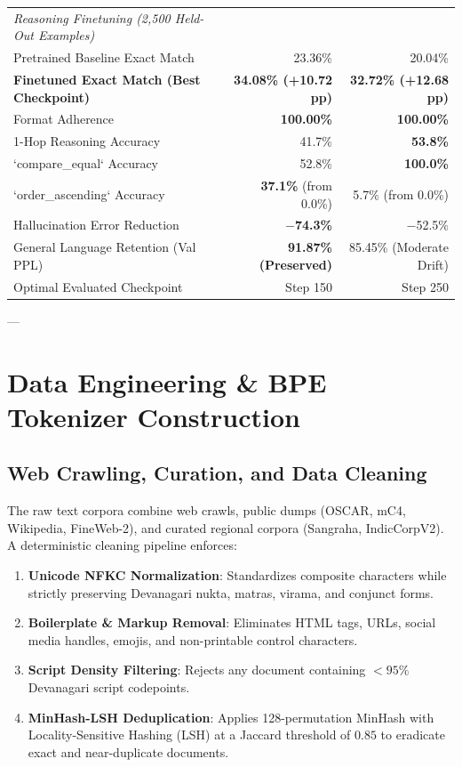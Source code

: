 \documentclass[11pt,a4paper]{article}
\begin{document}
\begin{table}[H]
\begin{tabular}{@{}lrr@{}}
\midrule
\textit{Reasoning Finetuning (2,500 Held-Out Examples)} & & \\
Pretrained Baseline Exact Match & 23.36\% & 20.04\% \\
\textbf{Finetuned Exact Match (Best Checkpoint)} & \textbf{34.08\% (+10.72 pp)} & \textbf{32.72\% (+12.68 pp)} \\
Format Adherence & \textbf{100.00\%} & \textbf{100.00\%} \\
1-Hop Reasoning Accuracy & 41.7\% & \textbf{53.8\%} \\
`compare\_equal` Accuracy & 52.8\% & \textbf{100.0\%} \\
`order\_ascending` Accuracy & \textbf{37.1\%} (from 0.0\%) & 5.7\% (from 0.0\%) \\
Hallucination Error Reduction & \textbf{$-$74.3\%} & $-$52.5\% \\
General Language Retention (Val PPL) & \textbf{91.87\% (Preserved)} & 85.45\% (Moderate Drift) \\
Optimal Evaluated Checkpoint & Step 150 & Step 250 \\
\bottomrule
\end{tabular}
\end{table}

---

\section{Data Engineering \& BPE Tokenizer Construction}

\subsection{Web Crawling, Curation, and Data Cleaning}
The raw text corpora combine web crawls, public dumps (OSCAR, mC4, Wikipedia, FineWeb-2), and curated regional corpora (Sangraha, IndicCorpV2). A deterministic cleaning pipeline enforces:
\begin{enumerate}[noitemsep]
    \item \textbf{Unicode NFKC Normalization}: Standardizes composite characters while strictly preserving Devanagari nukta, matras, virama, and conjunct forms.
    \item \textbf{Boilerplate \& Markup Removal}: Eliminates HTML tags, URLs, social media handles, emojis, and non-printable control characters.
    \item \textbf{Script Density Filtering}: Rejects any document containing $< 95\%$ Devanagari script codepoints.
    \item \textbf{MinHash-LSH Deduplication}: Applies 128-permutation MinHash with Locality-Sensitive Hashing (LSH) at a Jaccard threshold of $0.85$ to eradicate exact and near-duplicate documents.
\end{enumerate}
\end{document}
